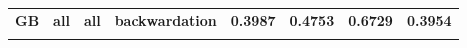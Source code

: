 \documentclass[
  authoryear,
  preprint,
  3p]{elsarticle}
\begin{document}
\begin{longtable}[t]{>{}l>{}l>{}l>{}r>{}r>{}r>{}r>{}r}
\textbf{GB} & \textbf{all} & \textbf{all} & \textbf{backwardation} & \textcolor[HTML]{4285f4}{\textbf{0.3987}} & \textcolor[HTML]{4285f4}{\textbf{0.4753}} & \textcolor[HTML]{4285f4}{\textbf{0.6729}} & \textcolor[HTML]{4285f4}{\textbf{0.3954}}\\
\textbf{\cellcolor{gray!10}{GB}} & \textbf{\cellcolor{gray!10}{all}} & \textbf{\cellcolor{gray!10}{all}} & \textbf{\cellcolor{gray!10}{contango}} & \textcolor[HTML]{4285f4}{\textbf{\cellcolor{gray!10}{0.4108}}} & \textcolor[HTML]{4285f4}{\textbf{\cellcolor{gray!10}{0.4652}}} & \textcolor[HTML]{4285f4}{\textbf{\cellcolor{gray!10}{0.6456}}} & \textcolor[HTML]{4285f4}{\textbf{\cellcolor{gray!10}{0.4797}}}\\
\bottomrule

\end{longtable}

\endgroup{}

\newpage
\end{document}

